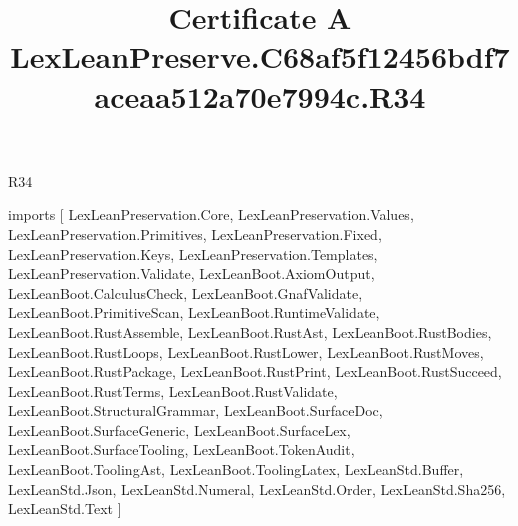 \begin{lexlean}{R34}
\title{Certificate A LexLeanPreserve.C68af5f12456bdf7aceaa512a70e7994c.R34}
\begin{coremodule}
imports [
  LexLeanPreservation.Core,
  LexLeanPreservation.Values,
  LexLeanPreservation.Primitives,
  LexLeanPreservation.Fixed,
  LexLeanPreservation.Keys,
  LexLeanPreservation.Templates,
  LexLeanPreservation.Validate,
  LexLeanBoot.AxiomOutput,
  LexLeanBoot.CalculusCheck,
  LexLeanBoot.GnafValidate,
  LexLeanBoot.PrimitiveScan,
  LexLeanBoot.RuntimeValidate,
  LexLeanBoot.RustAssemble,
  LexLeanBoot.RustAst,
  LexLeanBoot.RustBodies,
  LexLeanBoot.RustLoops,
  LexLeanBoot.RustLower,
  LexLeanBoot.RustMoves,
  LexLeanBoot.RustPackage,
  LexLeanBoot.RustPrint,
  LexLeanBoot.RustSucceed,
  LexLeanBoot.RustTerms,
  LexLeanBoot.RustValidate,
  LexLeanBoot.StructuralGrammar,
  LexLeanBoot.SurfaceDoc,
  LexLeanBoot.SurfaceGeneric,
  LexLeanBoot.SurfaceLex,
  LexLeanBoot.SurfaceTooling,
  LexLeanBoot.TokenAudit,
  LexLeanBoot.ToolingAst,
  LexLeanBoot.ToolingLatex,
  LexLeanStd.Buffer,
  LexLeanStd.Json,
  LexLeanStd.Numeral,
  LexLeanStd.Order,
  LexLeanStd.Sha256,
  LexLeanStd.Text
]


\end{coremodule}
\end{lexlean}
